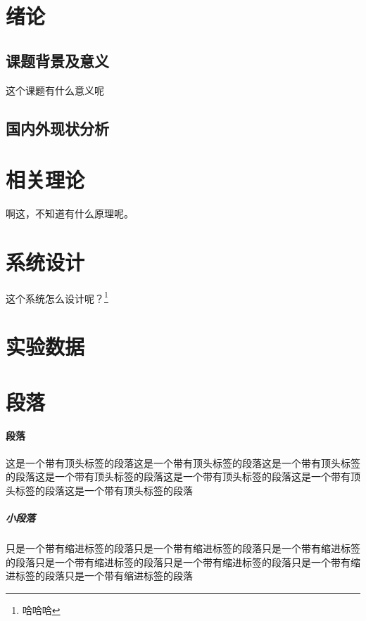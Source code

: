 \documentclass[supercite]{HustGraduPaper}
\begin{document}
	\clearpage%
	
	\section{绪论}
	
	\subsection{课题背景及意义}
	
	这个课题有什么意义呢

	\subsection{国内外现状分析}
	
	\section{相关理论}
	
	啊这，不知道有什么原理呢。
	
	\section{系统设计}	
	
	这个系统怎么设计呢？\footnote{哈哈哈}
	
	\section{实验数据}

	\section{段落}
	\paragraph{段落}\label{para:para}这是一个带有顶头标签的段落这是一个带有顶头标签的段落这是一个带有顶头标签的段落这是一个带有顶头标签的段落这是一个带有顶头标签的段落这是一个带有顶头标签的段落这是一个带有顶头标签的段落
	\subparagraph{小段落}\label{subpara:subpara}只是一个带有缩进标签的段落只是一个带有缩进标签的段落只是一个带有缩进标签的段落只是一个带有缩进标签的段落只是一个带有缩进标签的段落只是一个带有缩进标签的段落只是一个带有缩进标签的段落
\end{document}
